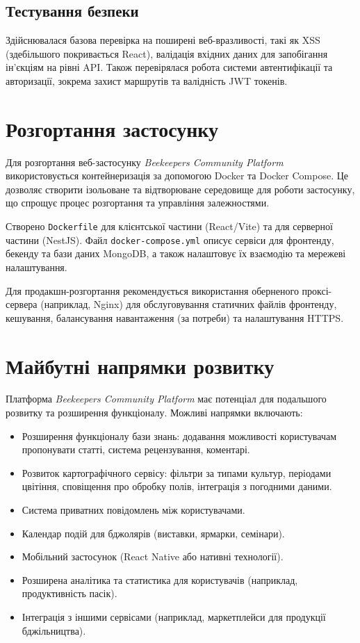 \subsection{Тестування безпеки}
Здійснювалася базова перевірка на поширені веб-вразливості, такі як XSS (здебільшого покривається React), валідація вхідних даних для запобігання ін'єкціям на рівні API. Також перевірялася робота системи автентифікації та авторизації, зокрема захист маршрутів та валідність JWT токенів.

\section{Розгортання застосунку}
\label{sec:deployment}
Для розгортання веб-застосунку \textit{Beekeepers Community Platform} використовується контейнеризація за допомогою Docker та Docker Compose. Це дозволяє створити ізольоване та відтворюване середовище для роботи застосунку, що спрощує процес розгортання та управління залежностями.

Створено \texttt{Dockerfile} для клієнтської частини (React/Vite) та для серверної частини (NestJS). Файл \texttt{docker-compose.yml} описує сервіси для фронтенду, бекенду та бази даних MongoDB, а також налаштовує їх взаємодію та мережеві налаштування.

Для продакшн-розгортання рекомендується використання оберненого проксі-сервера (наприклад, Nginx) для обслуговування статичних файлів фронтенду, кешування, балансування навантаження (за потреби) та налаштування HTTPS.

\section{Майбутні напрямки розвитку}
\label{sec:future_work}
Платформа \textit{Beekeepers Community Platform} має потенціал для подальшого розвитку та розширення функціоналу. Можливі напрямки включають:
\begin{itemize}
    \item Розширення функціоналу бази знань: додавання можливості користувачам пропонувати статті, система рецензування, коментарі.
    \item Розвиток картографічного сервісу: фільтри за типами культур, періодами цвітіння, сповіщення про обробку полів, інтеграція з погодними даними.
    \item Система приватних повідомлень між користувачами.
    \item Календар подій для бджолярів (виставки, ярмарки, семінари).
    \item Мобільний застосунок (React Native або нативні технології).
    \item Розширена аналітика та статистика для користувачів (наприклад, продуктивність пасік).
    \item Інтеграція з іншими сервісами (наприклад, маркетплейси для продукції бджільництва).
\end{itemize} 